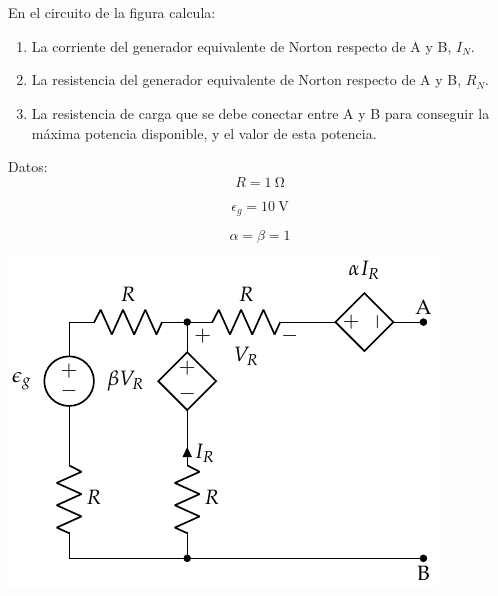 \documentclass[12pt]{article}
\begin{document}
\noindent\hrulefill

\clearpage

\section{}

En el circuito de la figura calcula:

\begin{enumerate}
\item La corriente del generador equivalente de Norton respecto de A y B, $I_N$.
\item La resistencia del generador equivalente de Norton respecto de A y B, $R_N$.
\item La resistencia de carga que se debe conectar entre A y B para conseguir la máxima potencia disponible, y el valor de esta potencia.
\end{enumerate}

\begin{minipage}{0.3\linewidth}
Datos:
\[
  R = \SI{1}{\ohm}
\]

\[
\epsilon_g = \SI{10}{\volt}
\]

\[
  \alpha = \beta = 1
\]

\end{minipage}
\begin{minipage}{0.7\linewidth}
\includegraphics[width=.9\linewidth]{figs/norton.pdf}
\end{minipage}
\end{document}
